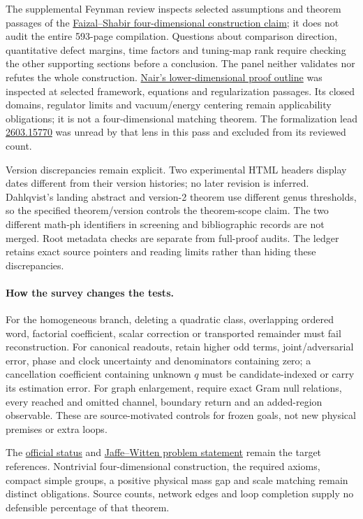 The supplemental Feynman review inspects selected assumptions and theorem passages of the \href{https://arxiv.org/abs/2606.19362}{Faizal--Shabir four-dimensional construction claim}; it does not audit the entire 593-page compilation. Questions about comparison direction, quantitative defect margins, time factors and tuning-map rank require checking the other supporting sections before a conclusion. The panel neither validates nor refutes the whole construction. \href{https://arxiv.org/html/2608.10133v2}{Nair's lower-dimensional proof outline} was inspected at selected framework, equations and regularization passages. Its closed domains, regulator limits and vacuum/energy centering remain applicability obligations; it is not a four-dimensional matching theorem. The formalization lead \href{https://arxiv.org/abs/2603.15770}{2603.15770} was unread by that lens in this pass and excluded from its reviewed count.

Version discrepancies remain explicit. Two experimental HTML headers display dates different from their version histories; no later revision is inferred. Dahlqvist's landing abstract and version-2 theorem use different genus thresholds, so the specified theorem/version controls the theorem-scope claim. The two different math-ph identifiers in screening and bibliographic records are not merged. Root metadata checks are separate from full-proof audits. The ledger retains exact source pointers and reading limits rather than hiding these discrepancies.

\paragraph{How the survey changes the tests.} For the homogeneous branch, deleting a quadratic class, overlapping ordered word, factorial coefficient, scalar correction or transported remainder must fail reconstruction. For canonical readouts, retain higher odd terms, joint/adversarial error, phase and clock uncertainty and denominators containing zero; a cancellation coefficient containing unknown $q$ must be candidate-indexed or carry its estimation error. For graph enlargement, require exact Gram null relations, every reached and omitted channel, boundary return and an added-region observable. These are source-motivated controls for frozen goals, not new physical premises or extra loops.

The \href{https://www.claymath.org/millennium/yang-mills-the-maths-gap/}{official status} and \href{https://www.claymath.org/wp-content/uploads/2022/06/yangmills.pdf}{Jaffe--Witten problem statement} remain the target references. Nontrivial four-dimensional construction, the required axioms, compact simple groups, a positive physical mass gap and scale matching remain distinct obligations. Source counts, network edges and loop completion supply no defensible percentage of that theorem.
